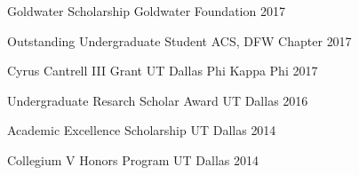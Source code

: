 \begin{cvhonors}
\cvhonor
{Goldwater Scholarship} %
{Goldwater Foundation} %
{} %
{2017} %


\cvhonor
{Outstanding Undergraduate Student} %
{ACS, DFW Chapter} %
{} %
{2017} %


\cvhonor
{Cyrus Cantrell III Grant} %
{UT Dallas Phi Kappa Phi} %
{} %
{2017} %


\cvhonor
{Undergraduate Resarch Scholar Award} %
{UT Dallas} %
{} %
{2016} %


\cvhonor
{Academic Excellence Scholarship} %
{UT Dallas} %
{} %
{2014} %


\cvhonor
{Collegium V Honors Program} %
{UT Dallas} %
{} %
{2014} %

\end{cvhonors}


